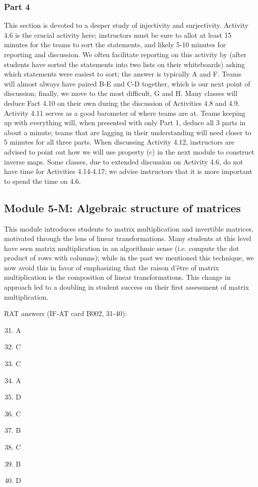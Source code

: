 \documentclass{article}
\begin{document}
\subsubsection*{Part 4}
This section is devoted to a deeper study of injectivity and surjectivity.  Activity 4.6 is the crucial activity here; instructors must be sure to allot at least 15 minutes for the teams to sort the statements, and likely 5-10 minutes for reporting and discussion.  We often facilitate reporting on this activity by (after students have sorted the statements into two lists on their whiteboards) asking which statements were easiest to sort; the answer is typically A and F.  Teams will almost always have paired B-E and C-D together, which is our next point of discussion; finally, we move to the most difficult, G and H.  Many classes will deduce Fact 4.10 on their own during the discussion of Activities 4.8 and 4.9.  Activity 4.11 serves as a good barometer of where teams are at.  Teams keeping up with everything will, when presented with only Part 1, deduce all 3 parts in about a minute; teams that are lagging in their understanding will need closer to 5 minutes for all three parts.  When discussing Activity 4.12, instructors are advised to point out how we will use property (c) in the next module to construct inverse maps.  Some classes, due to extended discussion on Activity 4.6, do not have time for Activities 4.14-4.17; we advise instructors that it is more important to spend the time on 4.6.

\subsection*{Module 5-M: Algebraic structure of matrices}
This module introduces students to matrix multiplication and invertible matrices, motivated through the lens of linear transformations.  Many students at this level have seen matrix multiplication in an algorithmic sense (i.e. compute the dot product of rows with columns); while in the past we mentioned this technique, we now avoid this in favor of emphasizing that the raison d'\^{e}tre of matrix multiplication is the composition of linear transformations.  This change in approach led to a doubling in student success on their first assessment of matrix multiplication.


RAT answers (IF-AT card B002, 31-40):
\begin{multicols}{10}
\begin{enumerate}[1)]
\setcounter{enumi}{30}
\item A
\item C
\item C
\item A
\item D
\item C
\item B
\item C
\item B
\item D
\end{enumerate}
\end{multicols}
\end{document}
